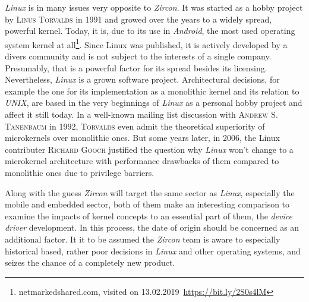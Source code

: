 \textit{Linux} is in many issues very opposite to \textit{Zircon}.
It was started as a hobby project by \textsc{Linus Torvalds} in 1991 and growed over the years to a widely spread, powerful kernel.
Today, it is, due to its use in \textit{Android}, the most used operating system kernel at all\footnote{netmarkedshared.com, visited on 13.02.2019~\url{https://bit.ly/2S0s4lM}}. 
Since Linux was published, it is actively developed by a divers community and is not subject to the interests of a single company. 
Presumably, that is a powerful factor for its spread besides its licensing.
Nevertheless, \textit{Linux} is a grown software project.
Architectural decisions, for example the one for its implementation as a monolithic kernel and its relation to \textit{UNIX}, are based in the very beginnings of \textit{Linux} as a personal hobby project and affect it still today.
In a well-known mailing list discussion with \textsc{Andrew S. Tanenbaum} in 1992, \textsc{Torvalds} even admit the theoretical superiority of microkernels over monolithic ones\cite{linux-is-obsolete}.
But some years later, in 2006, the Linux contributer \textsc{Richard Gooch} justified the question why \textit{Linux} won't change to a microkernel architecture with performance drawbacks of them compared to monolithic ones due to privilege barriers\cite{why-linux-monolith}.

Along with the guess \textit{Zircon} will target the same sector as \textit{Linux}, especially the mobile and embedded sector, both of them make an interesting comparison to examine the impacts of kernel concepts to an essential part of them, the \textit{device driver} development.
In this process, the date of origin should be concerned as an additional factor.
It it to be assumed the \textit{Zircon} team is aware to especially historical based, rather poor decisions in \textit{Linux} and other operating systems, and seizes the chance of a completely new product.




